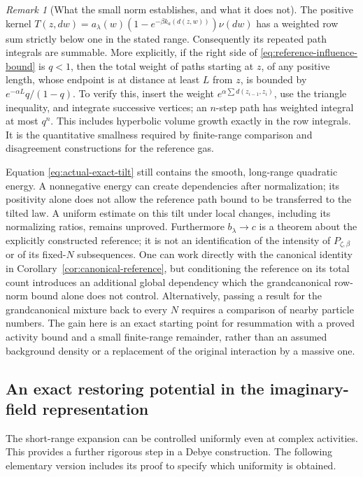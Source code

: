 \documentclass[11pt]{article}
\theoremstyle{remark}\newtheorem{remark}[theorem]{Remark}
\begin{document}
\begin{remark}[What the small norm establishes, and what it does not]
The positive kernel
$T(z,dw)=a_\lambda(w)(1-e^{-\beta k_a(d(z,w))})\nu(dw)$
has a weighted row sum strictly below one in the stated range.
Consequently its repeated path integrals are summable.  More explicitly,
if the right side of \eqref{eq:reference-influence-bound} is $q<1$,
then the total weight of paths starting at $z$, of any positive length,
whose endpoint is at distance at least $L$ from $z$, is bounded by
$e^{-\alpha L}q/(1-q)$.  To verify this, insert the weight
$e^{\alpha\sum d(z_{i-1},z_i)}$, use the triangle inequality, and
integrate successive vertices; an $n$-step path has weighted integral at
most $q^n$.  This includes hyperbolic volume growth exactly in the row
integrals.  It is the quantitative smallness required by finite-range
comparison and disagreement constructions for the reference gas.

Equation \eqref{eq:actual-exact-tilt} still contains the smooth, long-range
quadratic energy.  A nonnegative energy can create dependencies after
normalization; its positivity alone does not allow the reference path
bound to be transferred to the tilted law.  A uniform estimate on this
tilt under local changes, including its normalizing ratios, remains
unproved.  Furthermore $b_\lambda\to c$ is a theorem about the explicitly
constructed reference; it is not an identification of the intensity of
$P_{\zeta,\beta}$ or of its fixed-$N$ subsequences.  One can work
directly with the canonical identity in
Corollary~\ref{cor:canonical-reference}, but conditioning the reference
on its total count introduces an additional global dependency which the
grandcanonical row-norm bound alone does not control.  Alternatively,
passing a result for the grandcanonical mixture back to every $N$
requires a comparison of nearby particle numbers.  The gain here is an exact
starting point for resummation with a proved activity bound and a small
finite-range remainder, rather than an assumed background density or a
replacement of the original interaction by a massive one.
\end{remark}

\subsection{An exact restoring potential in the imaginary-field representation}

The short-range expansion can be controlled uniformly even at complex
activities.  This provides a further rigorous step in a Debye construction.
The following elementary version includes its proof to specify which
uniformity is obtained.
\end{document}
